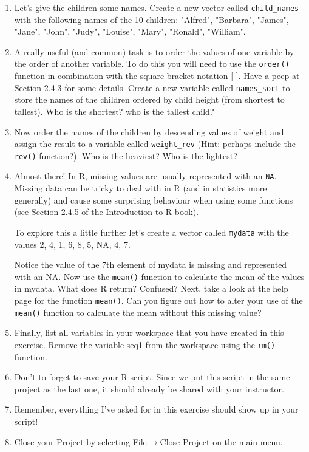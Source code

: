 \documentclass[12pt]{article}
\newcommand{\arrow}{\ensuremath{\rightarrow}}
\newcommand{\lst}[1]{\lstinline{#1}}
\begin{document}
\begin{enumerate}
 

\item Let’s give the children some names. Create a new vector called \lst{child_names} with the following names of the 10 children: "Alfred", "Barbara", "James", "Jane", "John", "Judy", "Louise", "Mary", "Ronald", "William".

 

\item A really useful (and common) task is to order the values of one variable by the order of another variable. To do this you will need to use the \lst{order()} function in combination with the square bracket notation [ ]. Have a peep at Section 2.4.3 for some details. Create a new variable called \lst{names_sort} to store the names of the children ordered by child height (from shortest to tallest). Who is the shortest? who is the tallest child?


\item Now order the names of the children by descending values of weight and assign the result to a variable called \lst{weight_rev} (Hint: perhaps include the \lst{rev()} function?). Who is the heaviest? Who is the lightest?

 

\item Almost there! In R, missing values are usually represented with an \lst{NA}. Missing data can be tricky to deal with in R (and in statistics more generally) and cause some surprising behaviour when using some functions (see Section 2.4.5 of the Introduction to R book).

 To explore this a little further let’s create a vector called 
\lst{mydata} with the values 2, 4, 1, 6, 8, 5, NA, 4, 7. 

Notice the value of the 7th element of mydata is missing and represented with an NA. Now use the \lst{mean()} function to calculate the mean of the values in mydata. What does R return? Confused? Next, take a look at the help page for the function \lst{mean()}. 
Can you figure out how to alter your use of the \lst{mean()} function to calculate the mean without this missing value?

 

\item Finally, list all variables in your workspace that you have created in this exercise. Remove the variable seq1 from the workspace using the \lst{rm()} function.
 

\item Don’t to forget to save your R script. Since we put this script in the same project
as the last one, it should already be shared with your
instructor.

\item Remember, everything I've asked for in this exercise should show up
in your script!

\item

Close your Project by selecting File\arrow Close Project on the main menu.

\end{enumerate}
\end{document}
